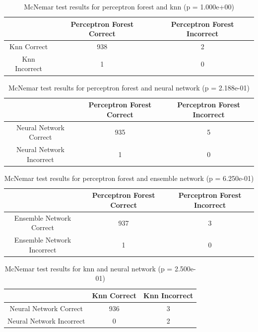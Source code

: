 \documentclass[paper=a4, fontsize=11pt]{scrartcl} %
\begin{document}
\begin{appendices}
\begin{table}[H]
	\centering
	\caption{McNemar test results for perceptron forest and knn (p = 1.000e+00)}
	\begin{tabular}{|c||c|c|}
		\hline
		& Perceptron Forest Correct & Perceptron Forest Incorrect \\ \hline \hline
		Knn Correct & 938 & 2 \\ \hline
		Knn Incorrect& 1 & 0 \\ \hline
	\end{tabular}
\end{table}

\begin{table}[H]
	\centering
	\caption{McNemar test results for perceptron forest and neural network (p = 2.188e-01)}
	\begin{tabular}{|c||c|c|}
		\hline
		& Perceptron Forest Correct & Perceptron Forest Incorrect \\ \hline \hline
		Neural Network Correct & 935 & 5 \\ \hline
		Neural Network Incorrect& 1 & 0 \\ \hline
	\end{tabular}
\end{table}

\begin{table}[H]
	\centering
	\caption{McNemar test results for perceptron forest and ensemble network (p = 6.250e-01)}
	\begin{tabular}{|c||c|c|}
		\hline
		& Perceptron Forest Correct & Perceptron Forest Incorrect \\ \hline \hline
		Ensemble Network Correct & 937 & 3 \\ \hline
		Ensemble Network Incorrect& 1 & 0 \\ \hline
	\end{tabular}
\end{table}

\begin{table}[H]
	\centering
	\caption{McNemar test results for knn and neural network (p = 2.500e-01)}
	\begin{tabular}{|c||c|c|}
		\hline
		& Knn Correct & Knn Incorrect \\ \hline \hline
		Neural Network Correct & 936 & 3 \\ \hline
		Neural Network Incorrect& 0 & 2 \\ \hline
	\end{tabular}
\end{table}


\end{appendices}
\end{document}
